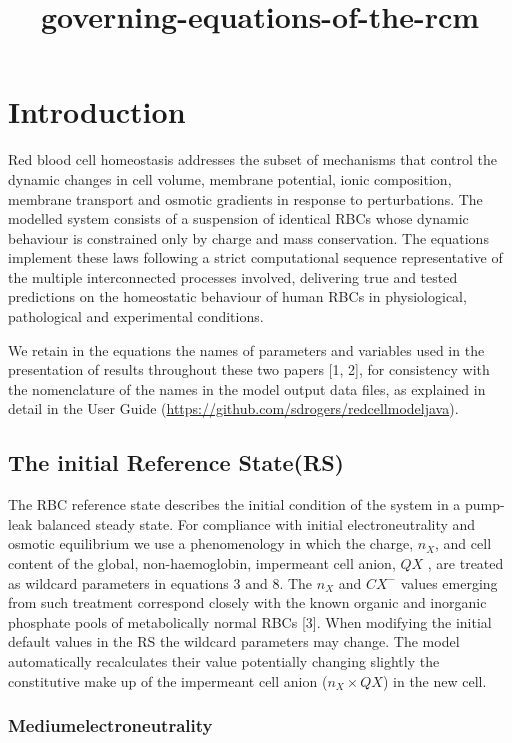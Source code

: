 \documentclass[a4paper]{article}
\title{governing-equations-of-the-rcm}
\newcommand{\cell}[1]{C#1}
\newcommand{\nX}{n_{X}}
\newcommand{\CXm}{\cell{X^{-}}}
\newcommand{\QX}{QX}
\begin{document}
\maketitle

\section{Introduction}\label{introduction}

Red blood cell homeostasis addresses the subset of mechanisms that
control the dynamic changes in cell volume, membrane potential, ionic
composition, membrane transport and osmotic gradients in response to
perturbations. The modelled system consists of a suspension of identical
RBCs whose dynamic behaviour is constrained only by charge and mass
conservation. The equations implement these laws following a strict
computational sequence representative of the multiple interconnected
processes involved, delivering true and tested predictions on the
homeostatic behaviour of human RBCs in physiological, pathological and
experimental conditions.

We retain in the equations the names of parameters and variables used in
the presentation of results throughout these two papers {[}1, 2{]}, for
consistency with the nomenclature of the names in the model output data
files, as explained in detail in the User Guide
(\url{https://github.com/sdrogers/redcellmodeljava}).

\subsection{The initial Reference State(RS)}

The RBC reference state describes the initial condition of the system in
a pump-leak balanced steady state. For compliance with initial
electroneutrality and osmotic equilibrium we use a phenomenology in
which the charge, $\nX$, and cell content of the global, non-haemoglobin,
impermeant cell anion, $\QX$ , are treated as wildcard parameters in
equations 3 and 8. The $\nX$ and $\CXm$ values emerging from such treatment
correspond closely with the known organic and inorganic phosphate pools
of metabolically normal RBCs {[}3{]}. When modifying the initial default
values in the RS the wildcard parameters may change. The model
automatically recalculates their value potentially changing slightly the
constitutive make up of the impermeant cell anion ($\nX \times \QX$) in
the new cell.

\subsubsection{Mediumelectroneutrality}\label{medium-electroneutrality}
\end{document}

